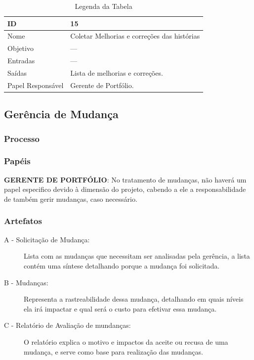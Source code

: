   \begin{table}[H]
    \centering
      \begin{tabular}{| m{5em} | m{10cm} |}
        \hline
        ID       & 15   \\ \hline
        Nome     & Coletar Melhorias e correções das histórias  \\ \hline
        Objetivo & ---  \\ \hline
        Entradas & ---\\ \hline
        Saídas   & Lista de melhorias e correções. \\ \hline
        Papel Responsável   & Gerente de Portfólio. \\ \hline
      \end{tabular}
      \caption{Legenda da Tabela}
      \label{tabela:atividade15}
  \end{table}

\subsection{Gerência de Mudança}\label{sec:gerencia}
\subsubsection{Processo}
\subsubsection{Papéis}

  \textbf{GERENTE DE PORTFÓLIO}: No tratamento de mudanças, não haverá um papel especifico devido
à dimensão do projeto, cabendo a ele a responsabilidade de também gerir mudanças, caso necessário.

\subsubsection{Artefatos}

\begin{description}
  \item[A - Solicitação de Mudança: ]
  Lista com as mudanças que necessitam ser analisadas pela gerência, a lista contém
  uma síntese detalhando porque a mudança foi solicitada.
  \item [B - Mudanças: ] Representa a rastreabilidade dessa mudança, detalhando em
  quais níveis ela irá impactar e qual será o custo para efetivar essa mudança.
  \item [C - Relatório de Avaliação de mundanças: ] O relatório explica o motivo e impactos da aceite
  ou recusa de uma mudança, e serve como base para realização das mudanças.
\end{description}

